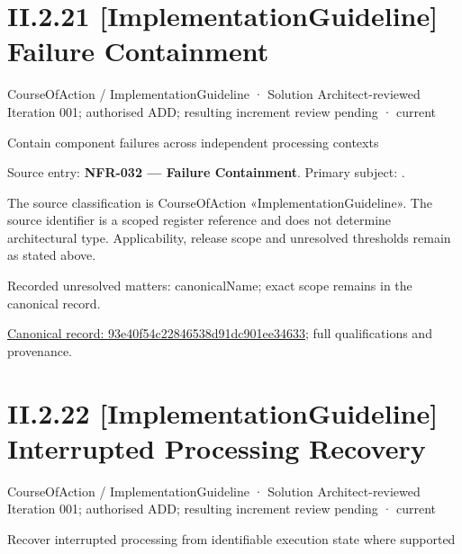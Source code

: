 \section*{II.2.21 [ImplementationGuideline] Failure Containment}
\label{navigation:II.2.21}

\label{element:93e40f54c22846538d91dc901ee34633}
{\small CourseOfAction / ImplementationGuideline · Solution Architect-reviewed Iteration 001; authorised ADD; resulting increment review pending · current}\par

Contain component failures across independent processing contexts



Source entry: \textbf{NFR-032 — Failure Containment}. Primary subject: \texttt{}.



The source classification is CourseOfAction «ImplementationGuideline». The source identifier is a scoped register reference and does not determine architectural type. Applicability, release scope and unresolved thresholds remain as stated above.


{\small Recorded unresolved matters: canonicalName; exact scope remains in the canonical record.}\par
{\footnotesize \href{../../../../../../../continuum/strategy/course-of-action/implementation-guideline/93e40f54c22846538d91dc901ee34633.md}{Canonical record: 93e40f54c22846538d91dc901ee34633}; full qualifications and provenance.}\par
\section*{II.2.22 [ImplementationGuideline] Interrupted Processing Recovery}
\label{navigation:II.2.22}

\label{element:6ca05ae8b3b34c1493ecdb48cfda1979}
{\small CourseOfAction / ImplementationGuideline · Solution Architect-reviewed Iteration 001; authorised ADD; resulting increment review pending · current}\par

Recover interrupted processing from identifiable execution state where supported



